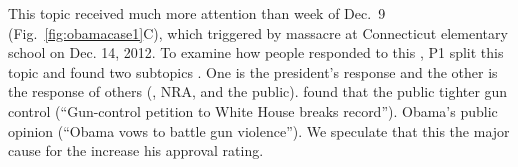 This topic received much more attention than  week of Dec.~9 (Fig.~\ref{fig:obamacase1}C),
which  triggered by  massacre at  Connecticut elementary school on Dec. 14, 2012.
To examine how people responded to this , P1 split this topic and found two subtopics .
One is the president's response and the other is the response of others (, NRA, and the public).
 found that the public  tighter gun control (``Gun-control petition to White House breaks record'').
Obama's  public opinion  (``Obama vows to battle gun violence'').
We speculate that this  the major cause for the increase  his approval rating.


